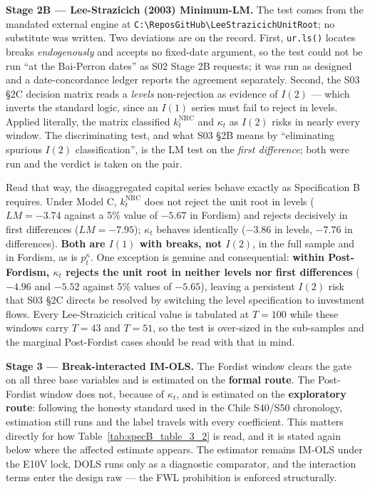 \documentclass[11pt,a4paper]{article}
\begin{document}
\noindent\textbf{Stage 2B --- Lee-Strazicich (2003) Minimum-LM.} The test comes from the mandated external engine at \texttt{C:\textbackslash ReposGitHub\textbackslash LeeStrazicichUnitRoot}; no substitute was written. Two deviations are on the record. First, \texttt{ur.ls()} locates breaks \textit{endogenously} and accepts no fixed-date argument, so the test could not be run ``at the Bai-Perron dates'' as S02 Stage 2B requests; it was run as designed and a date-concordance ledger reports the agreement separately. Second, the S03 \S2C decision matrix reads a \textit{levels} non-rejection as evidence of $I(2)$ --- which inverts the standard logic, since an $I(1)$ series must fail to reject in levels. Applied literally, the matrix classified $k_t^{\text{NRC}}$ and $\kappa_t$ as $I(2)$ risks in nearly every window. The discriminating test, and what S03 \S2B means by ``eliminating spurious $I(2)$ classification'', is the LM test on the \textit{first difference}; both were run and the verdict is taken on the pair.

Read that way, the disaggregated capital series behave exactly as Specification B requires. Under Model C, $k_t^{\text{NRC}}$ does not reject the unit root in levels ($LM = -3.74$ against a 5\% value of $-5.67$ in Fordism) and rejects decisively in first differences ($LM = -7.95$); $\kappa_t$ behaves identically ($-3.86$ in levels, $-7.76$ in differences). \textbf{Both are $I(1)$ with breaks, not $I(2)$}, in the full sample and in Fordism, as is $p_t^{\kappa}$. One exception is genuine and consequential: \textbf{within Post-Fordism, $\kappa_t$ rejects the unit root in neither levels nor first differences} ($-4.96$ and $-5.52$ against 5\% values of $-5.65$), leaving a persistent $I(2)$ risk that S03 \S2C directs be resolved by switching the level specification to investment flows. Every Lee-Strazicich critical value is tabulated at $T = 100$ while these windows carry $T = 43$ and $T = 51$, so the test is over-sized in the sub-samples and the marginal Post-Fordist cases should be read with that in mind.

\noindent\textbf{Stage 3 --- Break-interacted IM-OLS.} The Fordist window clears the gate on all three base variables and is estimated on the \textbf{formal route}. The Post-Fordist window does not, because of $\kappa_t$, and is estimated on the \textbf{exploratory route}: following the honesty standard used in the Chile S40/S50 chronology, estimation still runs and the label travels with every coefficient. This matters directly for how Table~\ref{tab:specB_table_3_2} is read, and it is stated again below where the affected estimate appears. The estimator remains IM-OLS under the E10V lock, DOLS runs only as a diagnostic comparator, and the interaction terms enter the design raw --- the FWL prohibition is enforced structurally.
\end{document}
